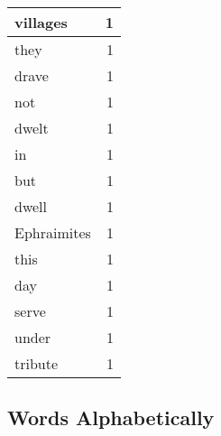 \begin{center}
\begin{longtable}{l|r}
villages & 1 \\ \hline
they & 1 \\ \hline
drave & 1 \\ \hline
not & 1 \\ \hline
dwelt & 1 \\ \hline
in & 1 \\ \hline
but & 1 \\ \hline
dwell & 1 \\ \hline
Ephraimites & 1 \\ \hline
this & 1 \\ \hline
day & 1 \\ \hline
serve & 1 \\ \hline
under & 1 \\ \hline
tribute & 1 \\ \hline
\end{longtable}
\end{center}



\normalsize



\subsection{Words Alphabetically}

